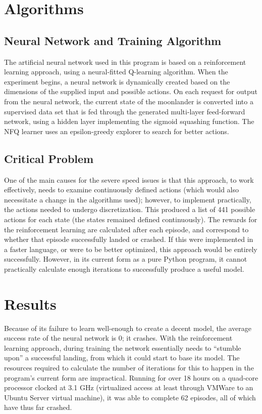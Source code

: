 \documentclass[12pt, article]{scrartcl}
\begin{document}
\section{Algorithms}
\subsection{Neural Network and Training Algorithm}
The artificial neural network used in this program is based on a reinforcement learning approach, using a neural-fitted Q-learning algorithm. When the experiment begins, a neural network is dynamically created based on the dimensions of the supplied input and possible actions. On each request for output from the neural network, the current state of the moonlander is converted into a supervised data set that is fed through the generated multi-layer feed-forward network, using a hidden layer implementing the sigmoid squashing function. The NFQ learner uses an epsilon-greedy explorer to search for better actions.

\subsection{Critical Problem}
One of the main causes for the severe speed issues is that this approach, to work effectively, needs to examine continuously defined actions (which would also necessitate a change in the algorithms used); however, to implement practically, the actions needed to undergo discretization. This produced a list of 441 possible actions for each state (the states remained defined continuously). The rewards for the reinforcement learning are calculated after each episode, and correspond to whether that episode successfully landed or crashed. If this were implemented in a faster language, or were to be better optimized, this approach would be entirely successfully. However, in its current form as a pure Python program, it cannot practically calculate enough iterations to successfully produce a useful model. 

\section{Results}
Because of its failure to learn well-enough to create a decent model, the average success rate of the neural network is 0; it crashes. With the reinforcement learning approach, during training the network essentially needs to ``stumble upon'' a successful landing, from which it could start to base its model. The resources required to calculate the number of iterations for this to happen in the program's current form are impractical. Running for over 18 hours on a quad-core processor clocked at 3.1 GHz (virtualized access at least through VMWare to an Ubuntu Server virtual machine), it was able to complete 62 episodes, all of which have thus far crashed.
\end{document}
